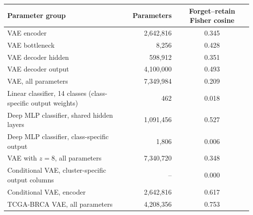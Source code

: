 \begin{tabular}{lrc}
\toprule
Parameter group & Parameters & Forget--retain Fisher cosine \\
\midrule
VAE encoder & 2,642,816 & 0.345 \\
VAE bottleneck & 8,256 & 0.428 \\
VAE decoder hidden & 598,912 & 0.351 \\
VAE decoder output & 4,100,000 & 0.493 \\
VAE, all parameters & 7,349,984 & 0.209 \\
\midrule
Linear classifier, 14 classes (class-specific output weights) & 462 & 0.018 \\
Deep MLP classifier, shared hidden layers & 1,091,456 & 0.527 \\
Deep MLP classifier, class-specific output & 1,806 & 0.006 \\
\midrule
VAE with $z=8$, all parameters & 7,340,720 & 0.348 \\
Conditional VAE, cluster-specific output columns & -- & 0.000 \\
Conditional VAE, encoder & 2,642,816 & 0.617 \\
TCGA-BRCA VAE, all parameters & 4,208,356 & 0.753 \\
\bottomrule
\end{tabular}
